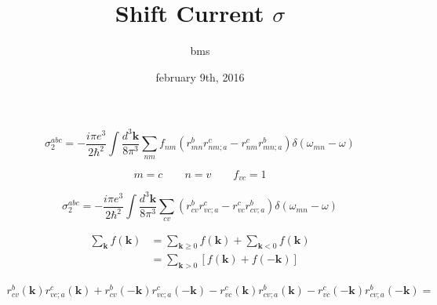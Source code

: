 \documentclass{article}
\title{Shift Current $\sigma$}
\author{bms}
\date{february 9th, 2016}
\begin{document}
\maketitle

\begin{equation*}
\sigma^{abc}_2 = - \frac{i \pi e^{3}}{2 \hbar^{2}} \int \frac{d^{3}\mathbf{k}}{8\pi^{3}}
\sum_{nm}f_{nm}(r^{b}_{mn} r^{c}_{nm;a} - r^{c}_{nm} r^{b}_{mn;a})
\delta(\omega_{mn} - \omega)
\end{equation*}

\begin{equation*}
m = c \qquad
n = v \qquad
f_{vc} = 1
\end{equation*}

\begin{equation*}
\sigma^{abc}_2 = - \frac{i \pi e^{3}}{2 \hbar^{2}} \int \frac{d^{3}\mathbf{k}}{8\pi^{3}}
\sum_{cv}(r^{b}_{cv} r^{c}_{vc;a} - r^{c}_{vc} r^{b}_{cv;a})
\delta(\omega_{mn} - \omega)
\end{equation*}

\begin{align*}
\sum_{\mathbf{k}}f(\mathbf{k}) &= \sum_{\mathbf{k}\geq 0}f(\mathbf{k}) + 
\sum_{\mathbf{k}<0}f(\mathbf{k}) \\
&= \sum_{\mathbf{k}>0} \left[f(\mathbf{k}) + f(\mathbf{-k}) \right]
\end{align*}

\begin{align*}      
  r^{b}_{cv}(\mathbf{k}) r^{c}_{vc;a}(\mathbf{k}) + r^{b}_{cv}(-\mathbf{k}) 
  r^{c}_{vc;a}(-\mathbf{k})
- r^{c}_{vc}(\mathbf{k}) r^{b}_{cv;a}(\mathbf{k}) - r^{c}_{vc}(-\mathbf{k})
  r^{b}_{cv;a}(-\mathbf{k}) =
\end{align*}        
\end{document}
